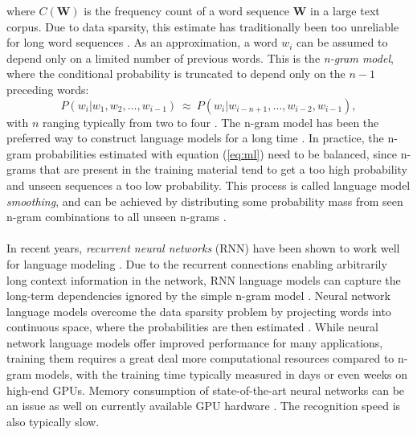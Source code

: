\documentclass[english, 12pt, a4paper, pdftex, elec, utf8]{aaltothesis}
\begin{document}
where $C(\bm{W})$ is the frequency count of a word sequence $\bm{W}$ in a large text corpus. Due to data sparsity, this estimate has traditionally been too unreliable for long word sequences \cite{gales2008application}. As an approximation, a word $w_i$ can be assumed to depend only on a limited number of previous words. This is the \textit{n-gram model}, where the conditional probability is truncated to depend only on the $n-1$ preceding words:
\begin{equation}
P(w_i|w_1,w_2,\dots,w_{i-1}) \ \approx \ P(w_i|w_{i-n+1},\dots,w_{i-2},w_{i-1}),
\end{equation}
with $n$ ranging typically from two to four \cite[p.~210]{gales2008application}. The n-gram model has been the preferred way to construct language models for a long time \cite{gales2008application, kallasjoki2016, hirsimaki2009importance}. In practice, the n-gram probabilities estimated with equation (\ref{eq:ml}) need to be balanced, since n-grams that are present in the training material tend to get a too high probability and unseen sequences a too low probability. This process is called language model \textit{smoothing}, and can be achieved by distributing some probability mass from seen n-gram combinations to all unseen n-grams \cite{gales2008application}. \\\\
In recent years, \textit{recurrent neural networks} (RNN) have been shown to work well for language modeling \cite{enarvi2017automatic}. Due to the recurrent connections enabling arbitrarily long context information in the network, RNN language models can capture the long-term dependencies ignored by the simple n-gram model \cite{enarvi2017automatic, mansikkaniemi2017continuous}. Neural network language models overcome the data sparsity problem by projecting words into continuous space, where the probabilities are then estimated \cite{mansikkaniemi2017continuous}. While neural network language models offer improved performance for many applications, training them requires a great deal more computational resources compared to n-gram models, with the training time typically measured in days or even weeks on high-end GPUs. Memory consumption of state-of-the-art neural networks can be an issue as well on currently available GPU hardware \cite{enarvi2017automatic}. The recognition speed is also typically slow. \\\\
\end{document}
